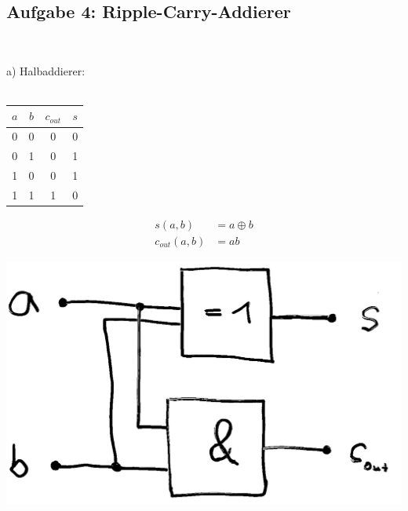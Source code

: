 \documentclass{article}
\begin{document}
	\newpage
	\subsection*{Aufgabe 4: Ripple-Carry-Addierer}
	\hfill \\
	\begin{minipage}[t]{0.02\linewidth}
		\hfill
	\end{minipage}
	\begin{minipage}[t]{0.2\linewidth}
		a) Halbaddierer: \\\\
		\begin{tabular}{cc|cc}
			$a$ & $b$ & $c_{out}$ & $s$ \\ \hline
			0 & 0 & 0 & 0 \\
			0 & 1 & 0 & 1 \\
			1 & 0 & 0 & 1 \\
			1 & 1 & 1 & 0 
		\end{tabular}
		\begin{align*}
			s(a,b) &= a \oplus b \\
			c_{out}(a,b) &= ab
		\end{align*}
	\end{minipage} 
	\begin{minipage}[t]{0.2\linewidth}
		\vspace*{1em}
		\includegraphics[width=\linewidth]{halfadder.jpeg}
	\end{minipage}
	\begin{minipage}[t]{0.1\linewidth}
		\hfill
	\end{minipage}
\end{document}
